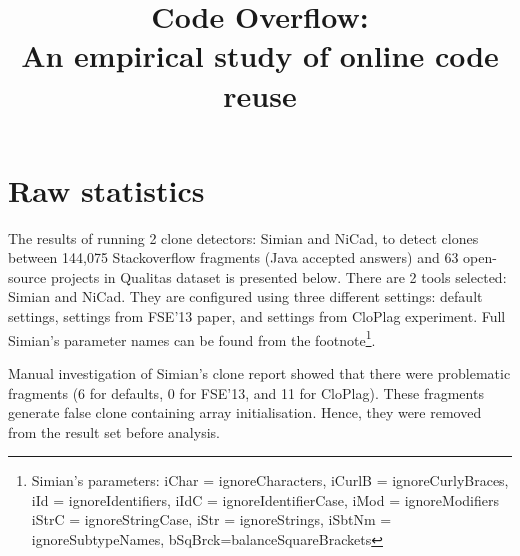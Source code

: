 \documentclass{IEEEtran}
\begin{document}
\onecolumn

\title{Code Overflow: \\
	An empirical study of online code reuse}
\maketitle

\section*{Raw statistics}
The results of running 2 clone detectors: Simian and NiCad, to detect clones between 144,075 Stackoverflow fragments (Java accepted answers) and 63 open-source projects in Qualitas dataset is presented below. There are 2 tools selected: Simian and NiCad. They are configured using three different settings: default settings, settings from FSE'13 paper, and settings from CloPlag experiment. Full Simian's parameter names can be found from the footnote\footnote{Simian's parameters: iChar = ignoreCharacters, iCurlB = ignoreCurlyBraces, iId = ignoreIdentifiers, iIdC = ignoreIdentifierCase, iMod = ignoreModifiers \newline iStrC = ignoreStringCase, iStr = ignoreStrings, iSbtNm = ignoreSubtypeNames, bSqBrck=balanceSquareBrackets}.

Manual investigation of Simian's clone report showed that there were problematic fragments (6 for defaults, 0 for FSE'13, and 11 for CloPlag). These fragments generate false clone containing array initialisation. Hence, they were removed from the result set before analysis.
\end{document}
